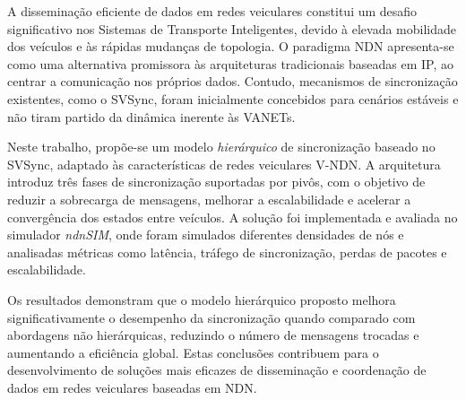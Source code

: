 
%

A disseminação eficiente de dados em redes veiculares constitui um desafio significativo nos Sistemas de Transporte Inteligentes, devido à elevada mobilidade dos veículos e às rápidas mudanças de topologia. O paradigma \gls{NDN} apresenta-se como uma alternativa promissora às arquiteturas tradicionais baseadas em IP, ao centrar a comunicação nos próprios dados. Contudo, mecanismos de sincronização existentes, como o \gls{SVSync}, foram inicialmente concebidos para cenários estáveis e não tiram partido da dinâmica inerente às \gls{VANETs}.

Neste trabalho, propõe-se um modelo \textit{hierárquico} de sincronização baseado no \gls{SVSync}, adaptado às características de redes veiculares \gls{V-NDN}. A arquitetura introduz três fases de sincronização suportadas por pivôs, com o objetivo de reduzir a sobrecarga de mensagens, melhorar a escalabilidade e acelerar a convergência dos estados entre veículos. A solução foi implementada e avaliada no simulador \textit{ndnSIM}, onde foram simulados diferentes densidades de nós e analisadas métricas como latência, tráfego de sincronização, perdas de pacotes e escalabilidade.

Os resultados demonstram que o modelo hierárquico proposto melhora significativamente o desempenho da sincronização quando comparado com abordagens não hierárquicas, reduzindo o número de mensagens trocadas e aumentando a eficiência global. Estas conclusões contribuem para o desenvolvimento de soluções mais eficazes de disseminação e coordenação de dados em redes veiculares baseadas em \gls{NDN}.


